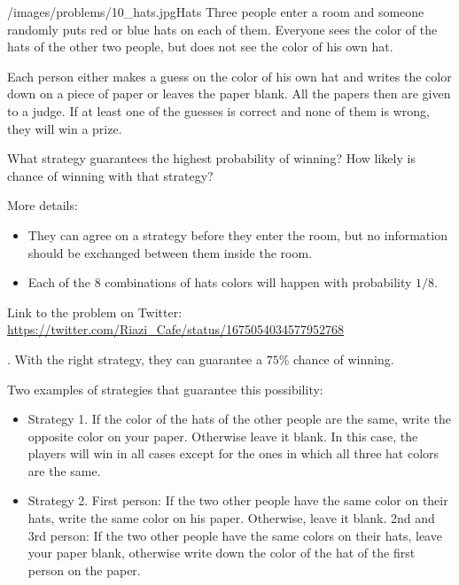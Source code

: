 \begin{problem}{/images/problems/10_hats.jpg}{Hats}
	Three people enter a room and someone randomly puts red or blue hats on each of them. Everyone sees the color of the hats of the other two people, but does not see the color of his own hat.

Each person either makes a guess on the color of his own hat and writes the color down on a piece of paper or leaves the paper blank. All the papers then are given to a judge. If at least one of the guesses is correct and none of them is wrong, they will win a  prize.

What strategy guarantees the highest probability of winning? How likely is chance of winning with that strategy?

More details:
\begin{itemize}
\item They can agree on a strategy before they enter the room, but no information should be exchanged between them inside the room.
\item Each of the 8 combinations of hats colors will happen with probability $1/8$.
\end{itemize}

Link to the problem on Twitter:  \url{https://twitter.com/Riazi_Cafe/status/1675054034577952768}
\end{problem}
\begin{solution}.
With the right strategy, they can guarantee a $75\%$ chance of winning.

Two examples of strategies that guarantee this possibility:

\begin{itemize}
	\item Strategy 1. If the color of the hats of the other people are the same, write the opposite color on your paper. Otherwise leave it blank. In this case, the players will win in all cases except for the ones in which all three hat colors are the same.

\item Strategy 2. First person: If the two other people have the same color on their hats, write the same color on his paper. Otherwise, leave it blank.
2nd and 3rd person: If the two other people have the same colors on their hats, leave your paper blank, otherwise write down the color of the hat of the first person on the paper.
\end{itemize}


\end{solution}